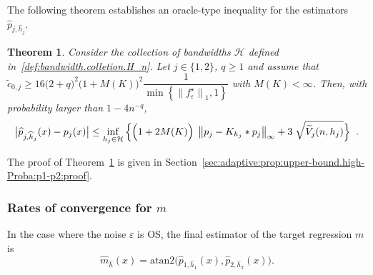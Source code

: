 \documentclass[11pt,a4paper,openany]{article}
\newtheorem{thm}{Theorem}[section]
\newcommand{\Atan}{\mbox{atan2}}
\begin{document}
The following theorem establishes an oracle-type inequality for the estimators $\widehat{p}_{j , \widehat{h}_{j}}$. 
\begin{thm}\label{adaptive:prop:upper-bound.high-Proba:p1-p2}
	Consider the collection of bandwidths $\mathcal{H}$ defined in~\eqref{def:bandwidth.colletion.H_n}. Let $j\in\{1,2\}$, $q \geq  1$ and assume that  $ \tilde c_{0,j} \geq 16 \big(2 + q \big)^{2}  \big( 1 + M(K) \big)^{2}  \dfrac{1}{ \min \left\{ \left\| f^{\star}_{\varepsilon}  \right\|_{1}, 1 \right\} } $ with $M(K) < \infty$. Then,  with probability larger than $1 - 4 n^{-q}$,  
	\begin{align*}
		\big| { \widehat{p}_{j,\widehat{h}_{j}}( x ) } - p_{j}(x)  \big|   \leq  \inf_{h_{j} \in \mathcal{H}} \Big\{  \Big( 1 + 2  M(K) \Big) \hspace{0.1cm}  %
		\left\| p_{j} - K_{h_{j}}*p_{j} \right\|_{\infty}  
		+  3 \hspace{0.1cm}   \sqrt{\widetilde{V}_{j}(n,h_{j})} \Big\} \hspace{0.2cm}  .  
	\end{align*}  
\end{thm}
\noindent
The proof of Theorem~\ref{adaptive:prop:upper-bound.high-Proba:p1-p2} is given in Section~\ref{sec:adaptive:prop:upper-bound.high-Proba:p1-p2:proof}. %

\subsubsection{Rates of convergence for $m$}

In the case where the noise  ${\varepsilon}$ is OS, the final estimator of the target regression $m$ is
\begin{equation}\label{estimator-m-linear}
\widehat{m}_{\widehat{h}}(x) =  \Atan \big( \widehat{p}_{1,\widehat{h}_{1}}(x), \widehat{p}_{2,\widehat{h}_{2}}(x) \big).
\end{equation}
\end{document}
